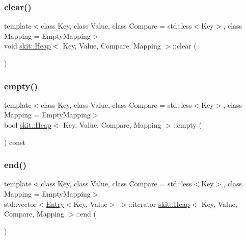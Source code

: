 \mbox{\label{classskit_1_1Heap_a4b66a7a19e736474fecbd8cbd9c805fd}} 
\subsubsection{\texorpdfstring{clear()}{clear()}}
{\footnotesize\ttfamily template$<$class Key, class Value, class Compare = std\+::less$<$\+Key$>$, class Mapping = Empty\+Mapping$>$ \\
void \hyperlink{classskit_1_1Heap}{skit\+::\+Heap}$<$ Key, Value, Compare, Mapping $>$\+::clear (\begin{DoxyParamCaption}{ }\end{DoxyParamCaption})\hspace{0.3cm}{\ttfamily [inline]}}

\mbox{\label{classskit_1_1Heap_a0614d39d1cec881a7cdf052ba2070f91}} 
\subsubsection{\texorpdfstring{empty()}{empty()}}
{\footnotesize\ttfamily template$<$class Key, class Value, class Compare = std\+::less$<$\+Key$>$, class Mapping = Empty\+Mapping$>$ \\
bool \hyperlink{classskit_1_1Heap}{skit\+::\+Heap}$<$ Key, Value, Compare, Mapping $>$\+::empty (\begin{DoxyParamCaption}{ }\end{DoxyParamCaption}) const\hspace{0.3cm}{\ttfamily [inline]}}

\mbox{\label{classskit_1_1Heap_ace004b7476332900f9d2823936948f83}} 
\subsubsection{\texorpdfstring{end()}{end()}}
{\footnotesize\ttfamily template$<$class Key, class Value, class Compare = std\+::less$<$\+Key$>$, class Mapping = Empty\+Mapping$>$ \\
std\+::vector$<$\hyperlink{structskit_1_1Entry}{Entry}$<$Key, Value$>$ $>$\+::iterator \hyperlink{classskit_1_1Heap}{skit\+::\+Heap}$<$ Key, Value, Compare, Mapping $>$\+::end (\begin{DoxyParamCaption}{ }\end{DoxyParamCaption})\hspace{0.3cm}{\ttfamily [inline]}}

